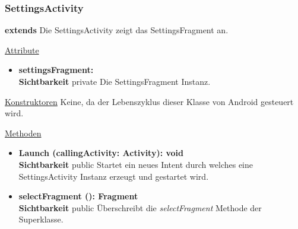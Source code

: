 \subsubsection{SettingsActivity} \label{app:klasse:SettingsActivity}
\textbf{extends}  \newline
Die SettingsActivity zeigt das SettingsFragment an.
\newline

\underline{Attribute}
\begin{itemize}
\itemsep0pt
\item \textbf{settingsFragment: } \hfill\\ 
\textbf{Sichtbarkeit} private\newline
Die SettingsFragment Instanz.

\end{itemize}

\underline{Konstruktoren}\newline
\indent Keine, da der Lebenszyklus dieser Klasse von Android gesteuert wird.\newline

\underline{Methoden}
\begin{itemize}
\itemsep0pt

\item \textbf{Launch (callingActivity: Activity): void}\hfill\\
\textbf{Sichtbarkeit} public\newline
Startet ein neues Intent durch welches eine SettingsActivity Instanz erzeugt und gestartet wird.

\item \textbf{selectFragment (): Fragment}\hfill\\
\textbf{Sichtbarkeit} public\newline
Überschreibt die \textit{selectFragment} Methode der Superklasse.

\end{itemize}